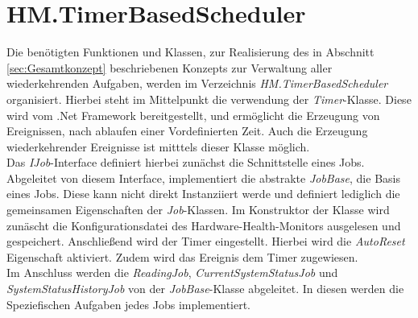 \newpage
\section{HM.TimerBasedScheduler}
Die benötigten Funktionen und Klassen, zur Realisierung des in Abschnitt \ref{sec:Gesamtkonzept} beschriebenen Konzepts zur Verwaltung aller wiederkehrenden Aufgaben, werden im Verzeichnis \textit{HM.TimerBasedScheduler} organisiert. Hierbei steht im Mittelpunkt die verwendung der \textit{Timer}-Klasse. Diese wird vom .Net Framework bereitgestellt, und ermöglicht die Erzeugung von Ereignissen, nach ablaufen einer Vordefinierten Zeit. Auch die Erzeugung wiederkehrender Ereignisse ist mitttels dieser Klasse möglich. \cite{SystemTimers}\\
Das \textit{IJob}-Interface definiert hierbei zunächst die Schnittstelle eines Jobs. Abgeleitet von diesem Interface, implementiert die abstrakte \textit{JobBase}, die Basis eines Jobs. Diese kann nicht direkt Instanziiert werde und definiert lediglich die gemeinsamen Eigenschaften der \textit{Job}-Klassen. Im Konstruktor der Klasse wird zunäscht die Konfigurationsdatei des Hardware-Health-Monitors ausgelesen und gespeichert. Anschließend wird der Timer eingestellt. Hierbei wird die \textit{AutoReset} Eigenschaft aktiviert. Zudem wird das Ereignis dem Timer zugewiesen.\\
Im Anschluss werden die \textit{ReadingJob}, \textit{CurrentSystemStatusJob} und \textit{SystemStatusHistoryJob} von der \textit{JobBase}-Klasse abgeleitet. In diesen werden die Speziefischen Aufgaben jedes Jobs implementiert.\\

